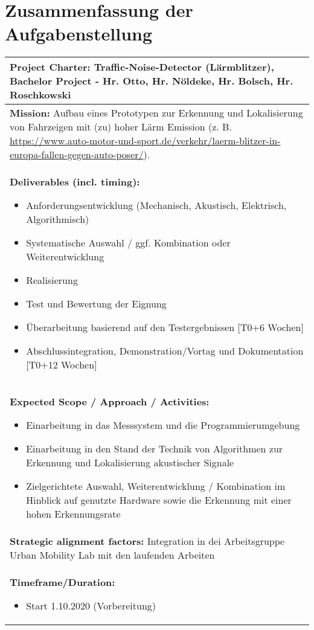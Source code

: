 \section{Zusammenfassung der Aufgabenstellung}

\begin{tabular}{|p{15cm}|}
\hline
\textbf{Project Charter:} Traffic-Noise-Detector (Lärmblitzer), Bachelor Project - Hr. Otto, Hr. Nöldeke, Hr. Bolsch, Hr. Roschkowski\\
\hline
\textbf{Mission:} Aufbau eines Prototypen zur Erkennung und Lokalisierung von Fahrzeigen mit (zu) hoher Lärm Emission (z. B. \url{https://www.auto-motor-und-sport.de/verkehr/laerm-blitzer-in-europa-fallen-gegen-auto-poser/}).\\
\hline
\textbf{Deliverables (incl. timing):}
\begin{itemize}
\item Anforderungsentwicklung (Mechanisch, Akustisch, Elektrisch, Algorithmisch)
\item Systematische Auswahl / ggf. Kombination oder Weiterentwicklung
\item Realisierung
\item Test und Bewertung der Eignung
\item Überarbeitung basierend auf den Testergebnissen [T0+6 Wochen]
\item Abschlussintegration, Demonstration/Vortag und Dokumentation [T0+12 Wochen]
\end{itemize}\\
\hline
\textbf{Expected Scope / Approach / Activities:}
\begin{itemize}
\item Einarbeitung in das Messsystem und die Programmierumgebung
\item Einarbeitung in den Stand der Technik von Algorithmen zur Erkennung und Lokalisierung akustischer Signale
\item Zielgerichtete Auswahl, Weiterentwicklung / Kombination im Hinblick auf genutzte Hardware sowie die Erkennung mit einer hohen Erkennungsrate
\end{itemize}\\
\hline
\textbf{Strategic alignment factors:}
\newline
Integration in dei Arbeitsgruppe Urban Mobility Lab mit den laufenden Arbeiten\\
\hline
\textbf{Timeframe/Duration:}
\begin{itemize}
\item Start 1.10.2020 (Vorbereitung)

\end{itemize}
\end{tabular}
